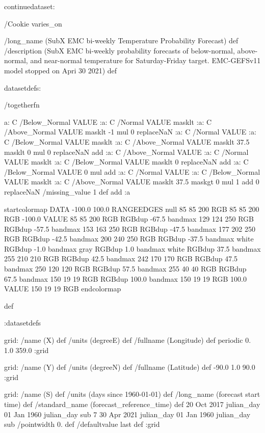 \begin{ingrid}

continuedataset:


/Cookie varies_on


/long_name (SubX EMC bi-weekly Temperature Probability Forecast) def
/description (SubX EMC bi-weekly probability forecasts of below-normal, above-normal, and near-normal temperature for Saturday-Friday target. EMC-GEFSv11 model stopped on Apri 30 2021) def

datasetdefs:

/togetherfn {
 a:
    C /Below_Normal VALUE
    :a:
     C /Normal VALUE
     masklt
    :a:
     C /Above_Normal VALUE
     masklt
    -1 mul
    0 replaceNaN
    :a:
     C /Normal VALUE
     :a:
      C /Below_Normal VALUE
      masklt
     :a:
      C /Above_Normal VALUE
      masklt
     37.5 masklt
     0 mul
     0 replaceNaN           
     add
    :a:
     C /Above_Normal VALUE
     :a:
      C /Normal VALUE
      masklt
     :a:
      C /Below_Normal VALUE
      masklt
     0 replaceNaN
     add
 :a:
     C /Below_Normal VALUE
     0 mul
     add
    :a:
     C /Normal VALUE
     :a:
      C /Below_Normal VALUE
      masklt
     :a:
      C /Above_Normal VALUE        
      masklt
     37.5 maskgt
     0 mul
     1 add
     0 replaceNaN
     /missing_value 1 def
     add
    :a

startcolormap
DATA -100.0 100.0 RANGEEDGES
null 85 85 200 RGB
85 85 200 RGB -100.0 VALUE
85 85 200 RGB RGBdup -67.5 bandmax
129 124 250 RGB RGBdup -57.5 bandmax
153 163 250 RGB RGBdup -47.5 bandmax
177 202 250 RGB RGBdup -42.5 bandmax
200 240 250 RGB RGBdup -37.5 bandmax
white RGBdup -1.0 bandmax
gray RGBdup 1.0 bandmax
white RGBdup 37.5 bandmax
255 210 210 RGB RGBdup 42.5 bandmax
242 170 170 RGB RGBdup 47.5 bandmax
250 120 120 RGB RGBdup 57.5 bandmax
255 40 40 RGB RGBdup 67.5 bandmax
150 19 19 RGB RGBdup 100.0 bandmax
150 19 19 RGB 100.0 VALUE
150 19 19 RGB
endcolormap
} def 

:datasetdefs


grid:
/name (X) def
/units (degreeE) def
/fullname (Longitude) def
periodic
0. 1.0 359.0
:grid

grid:
/name (Y) def
/units (degreeN) def
/fullname (Latitude) def
-90.0 1.0 90.0
:grid


grid:
/name (S) def
/units (days since 1960-01-01) def
/long_name (forecast start time) def
/standard_name (forecast_reference_time) def
20 Oct 2017 julian_day 01 Jan 1960 julian_day sub
7
30 Apr 2021 julian_day 01 Jan 1960 julian_day sub
/pointwidth 0. def
/defaultvalue { last } def
:grid


\end{ingrid}
